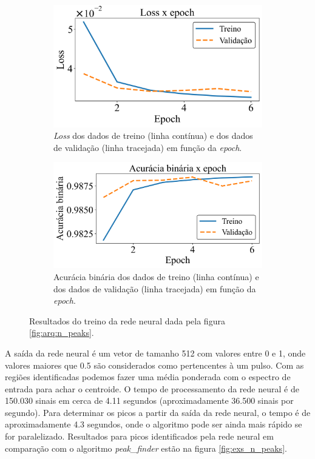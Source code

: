 \documentclass[a4paper,12pt,oneside]{book}
\begin{document}
\begin{figure}[H]
\centering
    \begin{subfigure}[t]{0.49\textwidth}
        \centering
        \includegraphics[scale=0.42]{figs/n_peaks_loss.png}
        \caption{\textit{Loss} dos dados de treino (linha contínua) e dos dados de validação (linha tracejada) em função da \textit{epoch}.}
        \label{subfig:n_peaks_loss}
    \end{subfigure}%
    \hfill
    \begin{subfigure}[t]{0.46\textwidth}
        \centering
        \includegraphics[scale=0.42]{figs/n_peaks_metric.png}
        \caption{Acurácia binária dos dados de treino (linha contínua) e dos dados de validação (linha tracejada) em função da \textit{epoch}.}
        \label{subfig:n_peaks_metric}
    \end{subfigure}
\caption{Resultados do treino da rede neural dada pela figura \ref{fig:arq:n_peaks}.}
\label{fig:n_peaks_results}
\end{figure}

\par A saída da rede neural é um vetor de tamanho 512 com valores entre 0 e 1, onde valores maiores que 0.5 são considerados como pertencentes à um pulso. Com as regiões identificadas podemos fazer uma média ponderada com o espectro de entrada para achar o centroide. O tempo de processamento da rede neural é de 150.030 sinais em cerca de 4.11 segundos (aproximadamente 36.500 sinais por segundo). Para determinar os picos a partir da saída da rede neural, o tempo é de aproximadamente 4.3 segundos, onde o algoritmo pode ser ainda mais rápido se for paralelizado. Resultados para picos identificados pela rede neural em comparação com o algoritmo \textit{peak\_finder} estão na figura \ref{fig:exs_n_peaks}.
\end{document}
